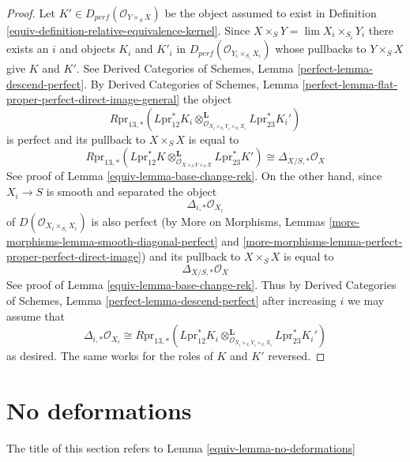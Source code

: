 \begin{proof}

Let $K' \in D_{perf}(\mathcal{O}_{Y \times_S X})$ be the object assumed to
exist in Definition \ref{equiv-definition-relative-equivalence-kernel}.
Since $X \times_S Y = \lim X_i \times_{S_i} Y_i$ there exists an
$i$ and objects $K_i$ and $K'_i$ in
$D_{perf}(\mathcal{O}_{Y_i \times_{S_i} X_i})$
whose pullbacks to $Y \times_S X$ give $K$ and $K'$.
See Derived Categories of Schemes, Lemma \ref{perfect-lemma-descend-perfect}.
By Derived Categories of Schemes, Lemma
\ref{perfect-lemma-flat-proper-perfect-direct-image-general}
the object
$$
R\text{pr}_{13, *}(L\text{pr}_{12}^*K_i
\otimes_{\mathcal{O}_{X_i \times_{S_i} Y_i \times_{S_i} X_i}}^\mathbf{L}
L\text{pr}_{23}^*K_i')
$$
is perfect and its pullback to $X \times_S X$ is equal to
$$
R\text{pr}_{13, *}(L\text{pr}_{12}^*K
\otimes_{\mathcal{O}_{X \times_S Y \times_S X}}^\mathbf{L}
L\text{pr}_{23}^*K') \cong \Delta_{X/S, *}\mathcal{O}_X
$$
See proof of Lemma \ref{equiv-lemma-base-change-rek}.
On the other hand, since $X_i \to S$ is smooth and separated the
object
$$
\Delta_{i, *}\mathcal{O}_{X_i}
$$
of $D(\mathcal{O}_{X_i \times_{S_i} X_i})$ is also perfect
(by More on Morphisms, Lemmas
\ref{more-morphisms-lemma-smooth-diagonal-perfect} and
\ref{more-morphisms-lemma-perfect-proper-perfect-direct-image}) and
its pullback to $X \times_S X$ is equal to
$$
\Delta_{X/S, *}\mathcal{O}_X
$$
See proof of Lemma \ref{equiv-lemma-base-change-rek}. Thus by
Derived Categories of Schemes, Lemma \ref{perfect-lemma-descend-perfect}
after increasing $i$ we may assume that
$$
\Delta_{i, *}\mathcal{O}_{X_i} \cong
R\text{pr}_{13, *}(L\text{pr}_{12}^*K_i
\otimes_{\mathcal{O}_{X_i \times_{S_i} Y_i \times_{S_i} X_i}}^\mathbf{L}
L\text{pr}_{23}^*K_i')
$$
as desired. The same works for the roles of $K$ and $K'$ reversed.
\end{proof}

\section{No deformations}
\label{equiv-section-no-deformations}
The title of this section refers to Lemma \ref{equiv-lemma-no-deformations}

